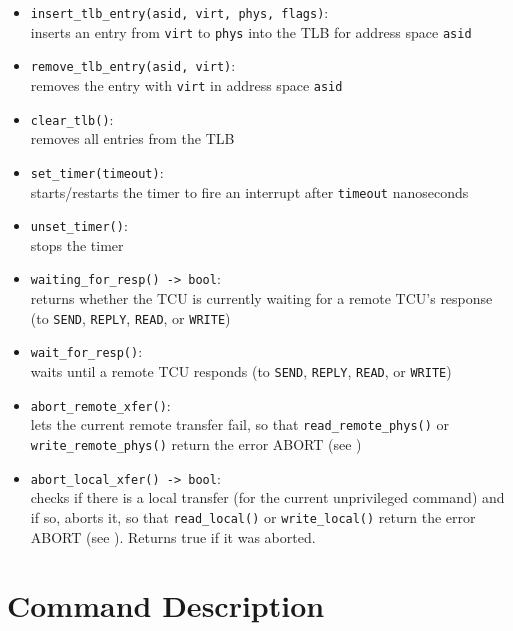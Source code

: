 \begin{itemize}
  \item \texttt{insert\_tlb\_entry(asid, virt, phys, flags)}: \\
  inserts an entry from \texttt{virt} to \texttt{phys} into the TLB for address space \texttt{asid}
  \item \texttt{remove\_tlb\_entry(asid, virt)}:\\
  removes the entry with \texttt{virt} in address space \texttt{asid}
  \item \texttt{clear\_tlb()}:\\
  removes all entries from the TLB \extend{}
  \item \texttt{set\_timer(timeout)}: \\
  starts/restarts the timer to fire an interrupt after \texttt{timeout} nanoseconds
  \item \texttt{unset\_timer()}:\\
  stops the timer
  \item \texttt{waiting\_for\_resp() -> bool}:\\
  returns whether the TCU is currently waiting for a remote TCU's response (to \texttt{SEND},
  \texttt{REPLY}, \texttt{READ}, or \texttt{WRITE})
  \item \texttt{wait\_for\_resp()}:\\
  waits until a remote TCU responds (to \texttt{SEND}, \texttt{REPLY}, \texttt{READ}, or
  \texttt{WRITE})
  \item \texttt{abort\_remote\_xfer()}:\\
  lets the current remote transfer fail, so that \texttt{read\_remote\_phys()} or \texttt{write\_remote\_phys()}
  return the error ABORT (see )
  \item \texttt{abort\_local\_xfer() -> bool}:\\
  checks if there is a local transfer (for the current unprivileged command) and if so, aborts it,
  so that \texttt{read\_local()} or \texttt{write\_local()} return the error ABORT (see
  ). Returns true if it was aborted. \extend{}
\end{itemize}

\section{Command Description}


